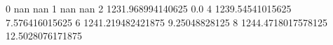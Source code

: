 0 nan nan
1 nan nan
2 1231.968994140625 0.0
4 1239.54541015625 7.576416015625
6 1241.219482421875 9.25048828125
8 1244.4718017578125 12.5028076171875
